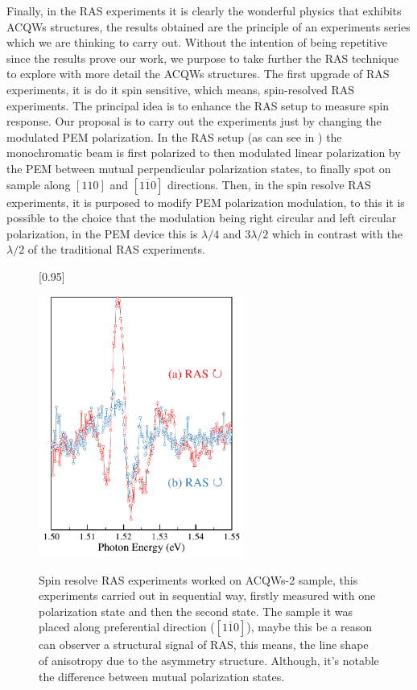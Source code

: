 Finally, in the RAS experiments it is clearly the wonderful physics that exhibits ACQWs
structures, the results obtained are the principle of an experiments series which we are
thinking to carry out. Without the intention of being repetitive since the results prove our work, we purpose to take further the RAS technique to explore with more detail the ACQWs structures. The first upgrade of RAS experiments, it is do it spin sensitive, which means, spin-resolved RAS experiments.
The principal idea is to enhance the RAS setup to measure spin response. Our proposal is to carry out the experiments just by changing the modulated PEM polarization. In the RAS setup (as can see in ) the monochromatic beam is first polarized to then modulated linear polarization by the PEM between mutual perpendicular polarization states, to finally spot on sample along  $[110]$ and $[1\overline{1}0]$  directions. Then, in the spin resolve RAS experiments, it is purposed to modify PEM polarization modulation, to this it is possible
to the choice that the modulation being right circular and left circular polarization, in the
PEM device this is $\lambda/4$ and $3\lambda/2$ which in contrast with the $\lambda/2$ of the traditional RAS
experiments.
\begin{figure}[H]
	[0.95\FBwidth]
	{ \caption{ Spin resolve RAS experiments worked on ACQWs-2 sample, this experiments carried out in sequential way, firstly measured with one polarization state and then the second state. The sample it was placed along preferential direction ($[1\overline{1}0]$), maybe this be a reason can observer a structural signal of RAS, this means, the line shape of  anisotropy due to the asymmetry structure. Although, it's notable the difference between mutual polarization states.
	}\label{fig:chapter-4-subsec-conclusion-ras-spin-1}}
	{
	\includegraphics[width=0.6\textwidth]{../figures/chapter-4/ras-spin/out/ras-spin-1.pdf}
	}
\end{figure}
